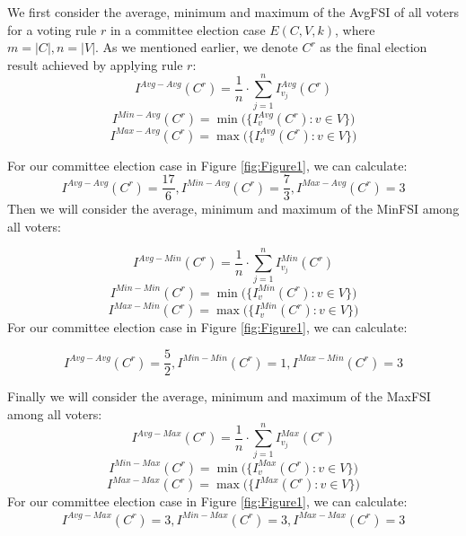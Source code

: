 \documentclass{article}
\begin{document}
We first consider the average, minimum and maximum of the AvgFSI of all voters for a voting rule $r$ in a committee election case $E(C,V,k)$,  where $m = \vert C \vert, n= \vert V \vert$. As we mentioned earlier, we denote $C^{r}$ as the final election result achieved by applying rule $r$:
\begin{equation}
     I^{Avg-Avg}(C^{r}) = \frac{1}{n}\cdot \sum_{j=1}^{n} I_{v_j}^{Avg}(C^{r})
\end{equation}\begin{equation}
     I^{Min-Avg}(C^{r}) = \min \big ( \{I_{v}^{Avg}(C^{r}): v \in V\}  \big) 
\end{equation}
\begin{equation}
     I^{Max-Avg}(C^{r}) = \max \big ( \{I_{v}^{Avg}(C^{r}): v \in V\}  \big) 
\end{equation}


For our committee election case in Figure   \ref{fig:Figure1}, we can calculate:
\begin{equation*}
 I^{Avg-Avg}(C^{r}) = \frac{17}{6},  I^{Min-Avg}(C^{r}) = \frac{7}{3},  I^{Max-Avg}(C^{r}) = 3
 \end{equation*}
Then we will consider the average, minimum and maximum of the MinFSI among all voters:

\begin{equation}
     I^{Avg-Min}(C^{r}) = \frac{1}{n}\cdot \sum_{j=1}^{n} I_{v_j}^{Min}(C^{r})
\end{equation}
\begin{equation}
     I^{Min-Min}(C^{r}) = \min \big ( \{I_{v}^{Min}(C^{r}): v \in V\}  \big) 
\end{equation}
\begin{equation}
     I^{Max-Min}(C^{r}) = \max \big ( \{I_{v}^{Min}(C^{r}): v \in V\}  \big) 
\end{equation}
For our committee election case in Figure   \ref{fig:Figure1}, we can calculate:

\begin{equation*}
 I^{Avg-Avg}(C^{r}) = \frac{5}{2}, I^{Min-Min}(C^{r}) = 1,  I^{Max-Min}(C^{r}) = 3
 \end{equation*}

Finally we will consider the average, minimum and maximum of the MaxFSI among all voters:
\begin{equation}
     I^{Avg-Max}(C^{r}) = \frac{1}{n}\cdot \sum_{j=1}^{n} I_{v_j}^{Max}(C^{r})
\end{equation}
\begin{equation}
     I^{Min-Max}(C^{r}) = \min \big ( \{I_{v}^{Max}(C^{r}): v \in V\}  \big) 
\end{equation}
\begin{equation}
     I^{Max-Max}(C^{r}) = \max \big ( \{I^{Max}(C^{r}): v \in V\}  \big) 
\end{equation}For our committee election case in Figure   \ref{fig:Figure1}, we can calculate:\begin{equation*}
    I^{Avg-Max}(C^{r}) = 3, I^{Min-Max}(C^{r}) = 3, I^{Max-Max}(C^{r}) = 3
\end{equation*}
\end{document}

